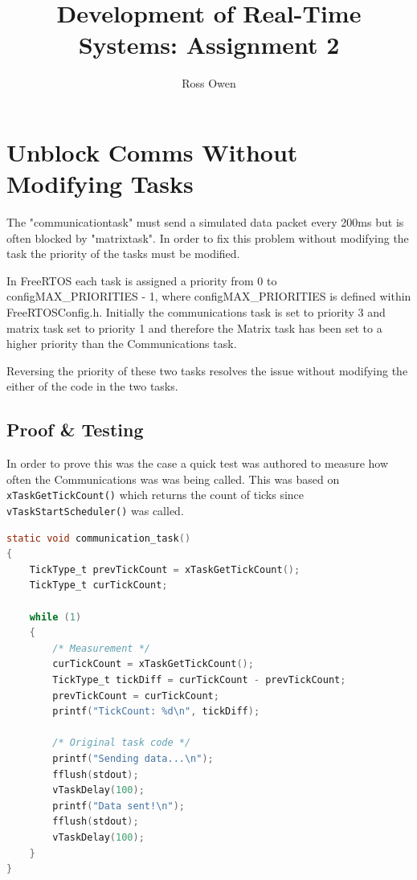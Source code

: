 \documentclass{article}
\begin{document}
\title{Development of Real-Time Systems: Assignment 2}
\author{Ross Owen}
\maketitle

\section{Unblock Comms Without Modifying Tasks}
The "communicationtask" must send a simulated data packet every 200ms but is often blocked by "matrixtask". In order to fix this problem without modifying the task the priority of the tasks must be modified.

In FreeRTOS each task is assigned a priority from 0 to configMAX\_PRIORITIES - 1, where configMAX\_PRIORITIES is defined within FreeRTOSConfig.h.
Initially the communications task is set to priority 3 and matrix task set to priority 1 and therefore the Matrix task has been set to a higher priority than the Communications task.

Reversing the priority of these two tasks resolves the issue without modifying the either of the code in the two tasks.

\subsection{Proof \& Testing}

In order to prove this was the case a quick test was authored to measure how often the Communications was was being called.
This was based on \verb|xTaskGetTickCount()| which returns the count of ticks since \verb|vTaskStartScheduler()| was called.

\begin{lstlisting}[language=C]
static void communication_task()
{
    TickType_t prevTickCount = xTaskGetTickCount();
    TickType_t curTickCount;
    
    while (1) 
    {
        /* Measurement */
        curTickCount = xTaskGetTickCount();
        TickType_t tickDiff = curTickCount - prevTickCount;
        prevTickCount = curTickCount;
        printf("TickCount: %d\n", tickDiff);    

        /* Original task code */
        printf("Sending data...\n");
        fflush(stdout);
        vTaskDelay(100);
        printf("Data sent!\n");
        fflush(stdout);
        vTaskDelay(100);
    }
}
\end{lstlisting}
\end{document}
